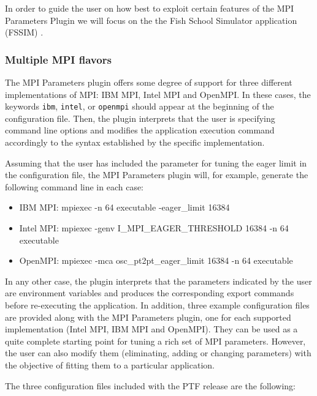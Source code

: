 In order to guide the user on how best to exploit certain features of the MPI Parameters Plugin we will focus on the the Fish School Simulator application (FSSIM) \cite{Mostaccio05}.

\subsubsection{Multiple MPI flavors}\label{para:MPI-mult}

The MPI Parameters plugin offers some degree of support for three different implementations of  MPI: IBM MPI, Intel MPI and OpenMPI. In these cases, the keywords {\tt ibm}, {\tt intel}, or {\tt openmpi} should appear at the beginning of the configuration file.  Then, the plugin interprets that the user is specifying command line options and modifies the application execution command accordingly to the syntax established by the specific implementation.

Assuming that the user has included the parameter for tuning the eager limit in the configuration file, the MPI Parameters plugin will, for example, generate the following command line in each case:

\begin {itemize}
\item IBM MPI: mpiexec -n 64 executable -eager\_limit 16384
\item Intel MPI: mpiexec -genv I\_MPI\_EAGER\_THRESHOLD 16384 -n 64 executable
\item OpenMPI: mpiexec -mca osc\_pt2pt\_eager\_limit 16384 -n 64 executable
\end{itemize}

In any other case, the plugin interprets that the parameters indicated by the user are environment variables and produces the corresponding export commands before re-executing the application.  In addition, three example configuration files are provided along with the MPI Parameters plugin, one for each supported implementation (Intel MPI, IBM MPI and OpenMPI). They can be used as a quite complete starting point for tuning a rich set of MPI parameters. However, the user can also modify them (eliminating, adding or changing parameters) with the objective of fitting them to a particular application.

The three configuration files included with the PTF release are the following:

